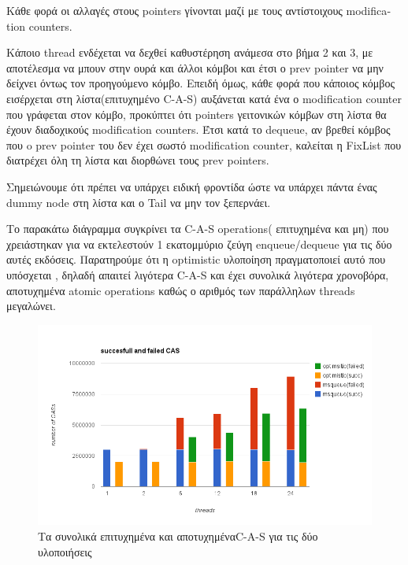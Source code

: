 Κάθε φορά οι αλλαγές στους \textlatin{pointers} γίνονται μαζί με τους αντίστοιχους \textlatin{modification counters}.

Κάποιο \textlatin{thread} ενδέχεται να δεχθεί καθυστέρηση ανάμεσα στο βήμα 2 και 3, με αποτέλεσμα να μπουν στην  ουρά και άλλοι κόμβοι και έτσι ο \textlatin{prev pointer} να μην δείχνει όντως τον προηγούμενο κόμβο. Επειδή όμως, κάθε  φορά που κάποιος κόμβος εισέρχεται στη λίστα(επιτυχημένο \textlatin{C-A-S}) αυξάνεται κατά ένα ο \textlatin{modification counter} που γράφεται στον κόμβο, προκύπτει ότι \textlatin{pointers} γειτονικών κόμβων στη λίστα θα έχουν διαδοχικούς \textlatin{modification counters}. Έτσι κατά το \textlatin{dequeue}, αν βρεθεί κόμβος που o \textlatin{prev pointer} του δεν έχει σωστό \textlatin{modification counter}, καλείται η \textlatin{FixList} που διατρέχει όλη τη λίστα και διορθώνει τους \textlatin{prev pointers}.

Σημειώνουμε ότι πρέπει να υπάρχει ειδική φροντίδα ώστε να υπάρχει πάντα ένας \textlatin{dummy node} στη λίστα και ο \textlatin{Tail}  να μην τον ξεπερνάει.

Το παρακάτω διάγραμμα συγκρίνει τα \textlatin{C-A-S operations}( επιτυχημένα και μη) που χρειάστηκαν για να εκτελεστούν 1 εκατομμύριο ζεύγη \textlatin{enqueue/dequeue} για τις δύο αυτές εκδόσεις. Παρατηρούμε ότι η \textlatin{optimistic} υλοποίηση πραγματοποιεί αυτό που υπόσχεται , δηλαδή απαιτεί λιγότερα \textlatin{C-A-S}  και έχει συνολικά λιγότερα χρονοβόρα, αποτυχημένα \textlatin{atomic operations} καθώς ο αριθμός των παράλληλων \textlatin{threads} μεγαλώνει.

\begin{figure}
 \centering
  \includegraphics[scale=0.5]{failed_cas.png}
\caption{Τα συνολικά επιτυχημένα και αποτυχημένα\textlatin{C-A-S} για τις δύο υλοποιήσεις}
\end{figure}


